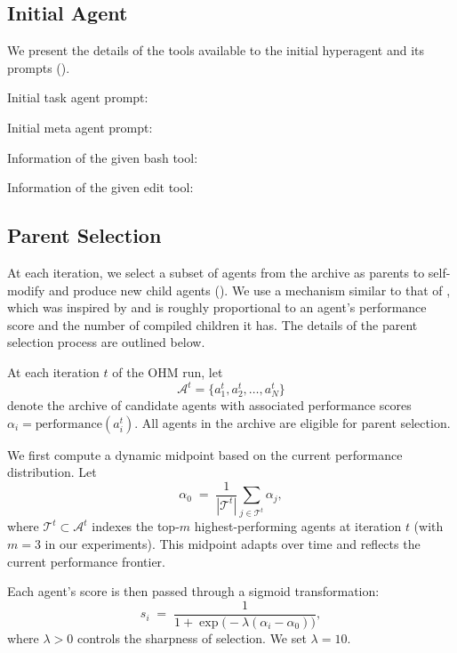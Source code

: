 \documentclass[]{fairmeta}
\begin{document}
\subsection{Initial Agent}
\label{app:initial-agent}

We present the details of the tools available to the initial hyperagent and its prompts ().

Initial task agent prompt:


Initial meta agent prompt:


Information of the given bash tool:


Information of the given edit tool:


\subsection{Parent Selection}
\label{app:parent-selection}


At each iteration, we select a subset of agents from the archive as parents to self-modify and produce new child agents (). We use a mechanism similar to that of \citet{zhang2025darwin}, which was inspired by \citet{ecoffet2019go} and is roughly proportional to an agent's performance score and the number of compiled children it has. The details of the parent selection process are outlined below.

At each iteration \(t\) of the OHM run, let
\[
\mathcal{A}^t = \{a_1^t, a_2^t, \dots, a_N^t\}
\]
denote the archive of candidate agents with associated performance scores
\(\alpha_i = \mathrm{performance}(a_i^t)\).
All agents in the archive are eligible for parent selection.

We first compute a dynamic midpoint based on the current performance distribution. Let
\[
\alpha_0 \;=\; \frac{1}{|\mathcal{T}^t|}\sum_{j \in \mathcal{T}^t} \alpha_j,
\]
where \(\mathcal{T}^t \subset \mathcal{A}^t\) indexes the top-\(m\) highest-performing agents at iteration \(t\) (with \(m=3\) in our experiments).
This midpoint adapts over time and reflects the current performance frontier.

Each agent's score is then passed through a sigmoid transformation:
\[
s_i \;=\; \frac{1}{1 + \exp\!\bigl(-\lambda(\alpha_i - \alpha_0)\bigr)},
\]
where \(\lambda > 0\) controls the sharpness of selection. We set \(\lambda = 10\).
\end{document}
